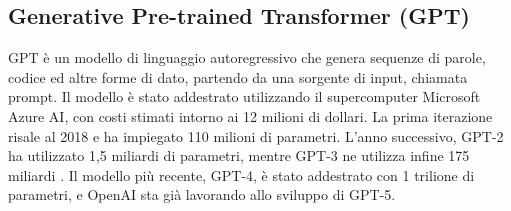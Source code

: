 \begin{table}[ht]
    \centering
    \vspace*{2mm}
    \caption{Confronto tra i diversi modelli di linguaggio \cite{yao2024survey}}
    \label{LLMs}
\end{table}

\subsection{Generative Pre-trained Transformer (GPT)}
GPT è un modello di linguaggio autoregressivo che genera sequenze di parole, codice ed altre forme di dato, partendo da una sorgente di input, chiamata prompt.
Il modello è stato addestrato utilizzando il supercomputer Microsoft Azure AI, con costi stimati intorno ai 12 milioni di dollari. La prima iterazione risale al 2018 e ha impiegato 110 milioni di parametri. L'anno successivo, GPT-2 ha utilizzato 1,5 miliardi di parametri, mentre GPT-3 ne utilizza infine 175 miliardi \cite{floridi2020gpt}.
Il modello più recente, GPT-4, è stato addestrato con 1 trilione di parametri, e OpenAI sta già lavorando allo sviluppo di GPT-5.


